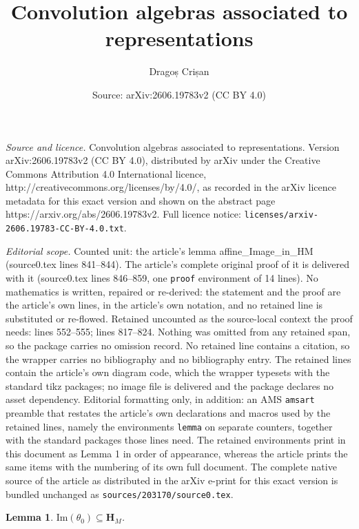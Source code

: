 \documentclass[10pt,a4paper]{amsart}
\title{Convolution algebras associated to representations}
\author{Dragoș Crișan}
\date{Source: arXiv:2606.19783v2 (CC BY 4.0)}
\newtheorem{lemma}{Lemma}
\renewcommand{\H}{\textbf{H}}
\renewcommand{\Im}{\text{Im}}
\renewcommand{\subset}{\subseteq}
\begin{document}
\maketitle

\noindent\emph{Source and licence.} Convolution algebras associated to representations. Version arXiv:2606.19783v2 (CC BY 4.0), distributed by arXiv under the Creative Commons Attribution 4.0 International licence, http://creativecommons.org/licenses/by/4.0/, as recorded in the arXiv licence metadata for this exact version and shown on the abstract page https://arxiv.org/abs/2606.19783v2. Full licence notice: \texttt{licenses/arxiv-2606.19783-CC-BY-4.0.txt}.\par\smallskip

\noindent\textit{Editorial scope.} Counted unit: the article's lemma affine\_Image\_in\_HM (source0.tex lines 841--844). The article's complete original proof of it is delivered with it (source0.tex lines 846--859, one \texttt{proof} environment of 14 lines). No mathematics is written, repaired or re-derived: the statement and the proof are the article's own lines, in the article's own notation, and no retained line is substituted or re-flowed.  Retained uncounted as the source-local context the proof needs: lines 552--555; lines 817--824.  Nothing was omitted from any retained span, so the package carries no omission record.  No retained line contains a citation, so the wrapper carries no bibliography and no bibliography entry.  The retained lines contain the article's own diagram code, which the wrapper typesets with the standard tikz packages; no image file is delivered and the package declares no asset dependency.  Editorial formatting only, in addition: an AMS \texttt{amsart} preamble that restates the article's own declarations and macros used by the retained lines, namely the environments \texttt{lemma} on separate counters, together with the standard packages those lines need.  The retained environments print in this document as Lemma 1 in order of appearance, whereas the article prints the same items with the numbering of its own full document.  The complete native source of the article as distributed in the arXiv e-print for this exact version is bundled unchanged as \texttt{sources/203170/source0.tex}.
\begin{lemma}
\label{finite_Image_in_HM}
    $\Im(\theta_0) \subset \H_M$.
\end{lemma}
\end{document}
